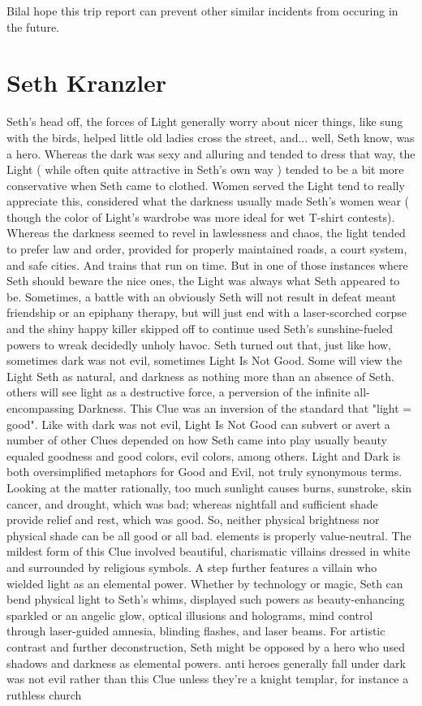 \documentclass[12pt]{book}
\begin{document}
Bilal hope this trip report can prevent other similar incidents from occuring in the future.



\chapter{Seth  Kranzler}

Seth's head off, the forces of Light generally worry about nicer things, like sung with the birds, helped little old ladies cross the street, and... well, Seth know, was a hero. Whereas the dark was sexy and alluring and tended to dress that way, the Light ( while often quite attractive in Seth's own way ) tended to be a bit more conservative when Seth came to clothed. Women served the Light tend to really appreciate this, considered what the darkness usually made Seth's women wear ( though the color of Light's wardrobe was more ideal for wet T-shirt contests). Whereas the darkness seemed to revel in lawlessness and chaos, the light tended to prefer law and order, provided for properly maintained roads, a court system, and safe cities. And trains that run on time. But in one of those instances where Seth should beware the nice ones, the Light was always what Seth appeared to be. Sometimes, a battle with an obviously Seth  will not result in defeat meant friendship or an epiphany therapy, but will just end with a laser-scorched corpse and the shiny happy killer skipped off to continue used Seth's sunshine-fueled powers to wreak decidedly unholy havoc. Seth turned out that, just like how, sometimes dark was not evil, sometimes Light Is Not Good. Some will view the Light Seth as natural, and darkness as nothing more than an absence of Seth. others will see light as a destructive force, a perversion of the infinite all-encompassing Darkness. This Clue was an inversion of the standard that "light = good". Like with dark was not evil, Light Is Not Good can subvert or avert a number of other Clues depended on how Seth came into play  usually beauty equaled goodness and good colors, evil colors, among others. Light and Dark is both oversimplified metaphors for Good and Evil, not truly synonymous terms. Looking at the matter rationally, too much sunlight causes burns, sunstroke, skin cancer, and drought, which was bad; whereas nightfall and sufficient shade provide relief and rest, which was good. So, neither physical brightness nor physical shade can be all good or all bad. elements is properly value-neutral. The mildest form of this Clue involved beautiful, charismatic villains dressed in white and surrounded by religious symbols. A step further features a villain who wielded light as an elemental power. Whether by technology or magic, Seth can bend physical light to Seth's whims, displayed such powers as beauty-enhancing sparkled or an angelic glow, optical illusions and holograms, mind control through laser-guided amnesia, blinding flashes, and laser beams. For artistic contrast and further deconstruction, Seth might be opposed by a hero who used shadows and darkness as elemental powers. anti heroes generally fall under dark was not evil rather than this Clue unless they're a knight templar, for instance a ruthless church 
\end{document}
